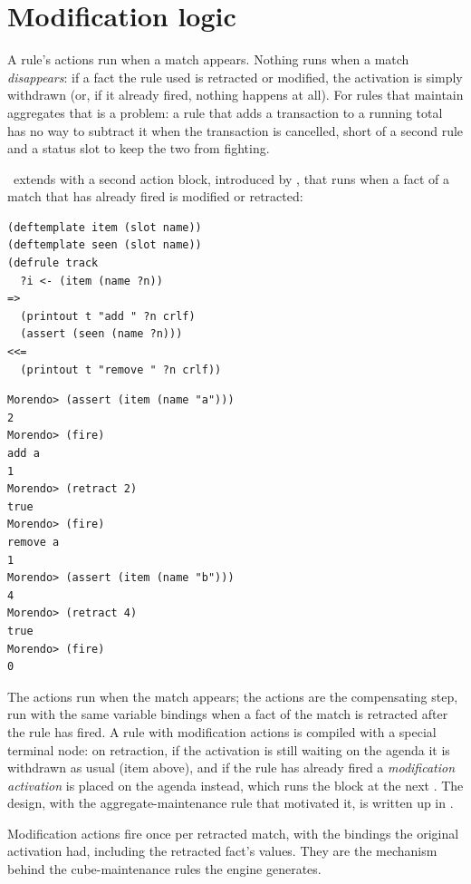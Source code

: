 \section{Modification logic}
\label{sec:modification-logic}

A rule's actions run when a match appears. Nothing runs when a match
\emph{disappears}: if a fact the rule used is retracted or modified, the
activation is simply withdrawn (or, if it already fired, nothing happens
at all). For rules that maintain aggregates that is a problem: a rule
that adds a transaction to a running total has no way to subtract it when
the transaction is cancelled, short of a second rule and a status slot to
keep the two from fighting.

\Morendo\ extends  with a second action block, introduced by
\fn{<<=}, that runs when a fact of a match that has already fired is
modified or retracted:

\begin{lstlisting}
(deftemplate item (slot name))
(deftemplate seen (slot name))
(defrule track
  ?i <- (item (name ?n))
=>
  (printout t "add " ?n crlf)
  (assert (seen (name ?n)))
<<=
  (printout t "remove " ?n crlf))
\end{lstlisting}

\begin{lstlisting}[style=shell]
Morendo> (assert (item (name "a")))
2
Morendo> (fire)
add a
1
Morendo> (retract 2)
true
Morendo> (fire)
remove a
1
Morendo> (assert (item (name "b")))
4
Morendo> (retract 4)
true
Morendo> (fire)
0
\end{lstlisting}

The \fn{=>} actions run when the match appears; the \fn{<<=} actions are
the compensating step, run with the same variable bindings when a fact of
the match is retracted after the rule has fired. A rule with modification
actions is compiled with a special terminal node: on retraction, if the
activation is still waiting on the agenda it is withdrawn as usual
(item  above), and if the rule has already fired a
\emph{modification activation} is placed on the agenda instead, which runs
the \fn{<<=} block at the next . The design, with the
aggregate-maintenance rule that motivated it, is written up in
.

Modification actions fire once per retracted match, with the bindings the
original activation had, including the retracted fact's values. They are
the mechanism behind the cube-maintenance rules the engine generates.
